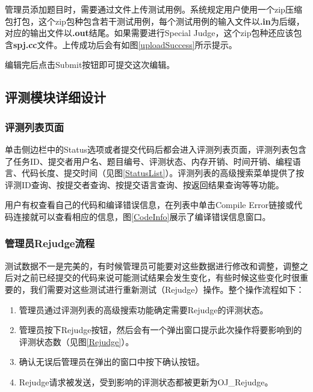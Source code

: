
管理员添加题目时，需要通过文件上传测试用例。系统规定用户使用一个zip压缩包打包，这个zip包种包含若干测试用例，每个测试用例的输入文件以\textbf{.in}为后缀，对应的输出文件以\textbf{.out}结尾。如果需要进行Special Judge，这个zip包种还应该包含\textbf{spj.cc}文件。上传成功后会有如图\ref{uploadSuccess}所示提示。


编辑完后点击Submit按钮即可提交这次编辑。

\subsection{评测模块详细设计}
\subsubsection{评测列表页面}
单击侧边栏中的Status选项或者提交代码后都会进入评测列表页面，评测列表包含了任务ID、提交者用户名、题目编号、评测状态、内存开销、时间开销、编程语言、代码长度、提交时间（见图\ref{StatusList}）。评测列表的高级搜索菜单提供了按评测ID查询、按提交者查询、按提交语言查询、按返回结果查询等等功能。

用户有权查看自己的代码和编译错误信息，在列表中单击Compile Error链接或代码连接就可以查看相应的信息，图\ref{CodeInfo}展示了编译错误信息窗口。


\subsubsection{管理员Rejudge流程}
测试数据不一是完美的，有时候管理员可能要对这些数据进行修改和调整，调整之后对之前已经提交的代码来说可能测试结果会发生变化，有些时候这些变化时很重要的，我们需要对这些测试进行重新测试（Rejudge）操作。整个操作流程如下：
\begin{enumerate}
	\item 管理员通过评测列表的高级搜索功能确定需要Rejudge的评测状态。
	\item 管理员按下Rejudge按钮，然后会有一个弹出窗口提示此次操作将要影响到的评测状态数（见图\ref{Rejudge}）。
	\item 确认无误后管理员在弹出的窗口中按下确认按钮。
	\item Rejudge请求被发送，受到影响的评测状态都被更新为OJ\_Rejudge。
\end{enumerate}

